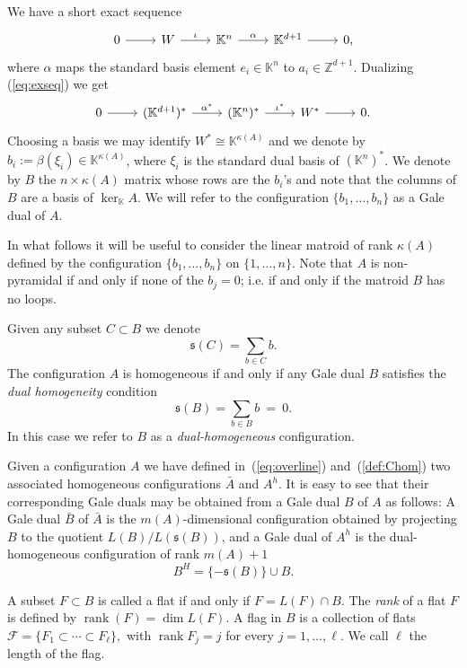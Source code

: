 \documentclass[11pt]{amsart}
\theoremstyle{plain}
\theoremstyle{definition}
\theoremstyle{remark}
\newcommand{\rank}{\operatorname{rank}}
\newcommand{\baseRing}[1]{\ensuremath{\mathbb{#1}}}
\newcommand{\Z}{\baseRing{Z}}
\newcommand{\beq}{\begin{equation}}
\newcommand{\eeq}{\end{equation}}
\renewcommand{\k}{{\mathbb K}}
\newcommand{\fs}{\mathfrak s}
\numberwithin{equation}{section}
\begin{document}
We have a short exact sequence
\beq\label{eq:exseq}
\begin{tikzcd}
0 \arrow[r] & W \arrow[r,"\iota"] & \k^n \arrow[r,"\alpha"] & \k^{d+1} \arrow[r] & 0,
\end{tikzcd}
\eeq
where $\alpha$ maps the standard basis element $e_i \in \k^n$ to 
$a_i \in \Z^{d+1}$.   Dualizing (\ref{eq:exseq}) we get
\beq\label{eq:exseqdual}
\begin{tikzcd}
0 \arrow[r] & (\k^{d+1})^* \arrow[r, "\alpha^*"] & (\k^n)^* \arrow[r,"\iota^*"] & W^* \arrow[r] & 0.
\end{tikzcd}
\eeq
Choosing a basis we may identify $W^* \cong \k^{\kappa(A)}$ and we denote by $b_i := \beta(\xi_i)\in \k^{\kappa(A)}$, where $\xi_i$ is the standard dual basis 
of $(\k^n)^*$.  We denote by $B$ the $n\times \kappa(A)$ matrix whose rows are the $b_i$'s and note that the columns of 
$B$ are a basis of $\ker_\k A$.  We will refer to the configuration 
$\{b_1,\dots,b_n\}$ as a Gale dual of $A$.  

In what follows it will be useful to consider the linear matroid of rank 
 $\kappa(A)$ defined by the configuration
$ \{b_1,\dots,b_n\}$ on $\{1,\dots,n\}$.  Note that $A$ is non-pyramidal if and only if none of the $b_j=0$; i.e. if and only if the matroid $B$ has no loops.  


Given any subset $C \subset B$ we denote
\begin{equation}\label{eq:sum} 
\fs(C) = \sum_{b\in C} b.
\end{equation}
 The configuration $A$ is homogeneous if and only if any Gale dual $B$ satisfies the {\em dual homogeneity} condition
$$ \fs(B)= \sum_{b\in B} b \ =\ 0.$$
In this case we refer to $B$ as a {\em dual-homogeneous} configuration.



Given a configuration $A$ we have defined in~(\ref{eq:overline}) and~(\ref{def:Chom}) two associated homogeneous configurations $\bar{A}$ and $A^h$.  
It is easy to see that their corresponding Gale duals may be obtained from a Gale dual $B$ of $A$ as follows:  A Gale dual $\bar{B}$ of $\bar{A}$ is the 
$m(A)$-dimensional configuration obtained by projecting $B$ to the quotient $L(B)/L(\fs(B))$, and a Gale dual of $A^h$ is the dual-homogeneous configuration of rank $m(A) + 1$
\beq\label{eq:homogB}
B^H = \{-\fs(B)\} \cup B .
\eeq 


A subset $F\subset B$ is called a flat  if and only if
$ F = L(F) \cap B$.  
The {\em rank} of a flat $F$ is defined by $\rank(F) = \dim L(F)$.
A flag in $B$  is a collection of flats
$\mathcal F = \{F_1 \subset \cdots \subset F_\ell\},$
with $\rank F_j = j$ for every $j=1, \dots, \ell$. 
We call $\ell$ the length of the flag.
\end{document}
